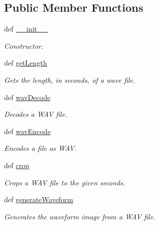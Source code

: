 \subsection*{Public Member Functions}
\begin{DoxyCompactItemize}
\item 
def \hyperlink{classconcertapp_1_1audio_1_1audio_formats_1_1_wav_af183bfb8095b4110faacb78ce70853cf}{\_\-\_\-init\_\-\_\-}
\begin{DoxyCompactList}\small\item\em Constructor. \item\end{DoxyCompactList}\item 
def \hyperlink{classconcertapp_1_1audio_1_1audio_formats_1_1_wav_a12808c742367349b3525437d0cc9e163}{getLength}
\begin{DoxyCompactList}\small\item\em Gets the length, in seconds, of a wave file. \item\end{DoxyCompactList}\item 
def \hyperlink{classconcertapp_1_1audio_1_1audio_formats_1_1_wav_a23b265b5e1dbb2330a34941d322f43e8}{wavDecode}
\begin{DoxyCompactList}\small\item\em Decodes a WAV file. \item\end{DoxyCompactList}\item 
def \hyperlink{classconcertapp_1_1audio_1_1audio_formats_1_1_wav_ac49ee70870aa8edaaa1f5d92a00c49a8}{wavEncode}
\begin{DoxyCompactList}\small\item\em Encodes a file as WAV. \item\end{DoxyCompactList}\item 
def \hyperlink{classconcertapp_1_1audio_1_1audio_formats_1_1_wav_ac0f03f8bce385f632fd58f20e7bd1353}{crop}
\begin{DoxyCompactList}\small\item\em Crops a WAV file to the given seconds. \item\end{DoxyCompactList}\item 
def \hyperlink{classconcertapp_1_1audio_1_1audio_formats_1_1_wav_a878e3b1ace4a06bb1cc310c9731ff4ec}{generateWaveform}
\begin{DoxyCompactList}\small\item\em Generates the waveform image from a WAV file. \item\end{DoxyCompactList}\item 

\end{DoxyCompactItemize}
